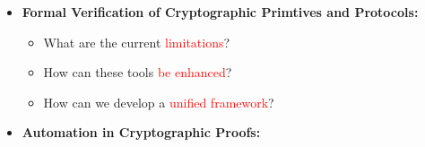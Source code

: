 \begin{itemize}
	\item \textbf{Formal Verification of Cryptographic Primtives and Protocols:}\\[0.2cm]
	\begin{itemize}
		\item[$\bullet$] What are the current \textcolor{red}{limitations}?\\[0.2cm]
		\item[$\bullet$] How can these tools \textcolor{red}{be enhanced}?\\[0.2cm]
		\item[$\bullet$] How can we develop a \textcolor{red}{unified framework}?
	\end{itemize}\vfill
	\item \textbf{Automation in Cryptographic Proofs:}\\[0.2cm]

\end{itemize}
